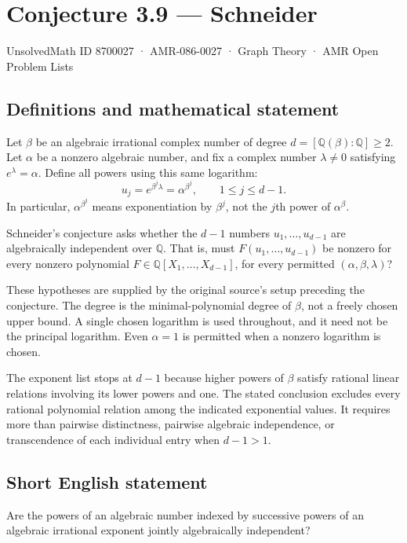 \documentclass[11pt,a4paper]{article}
\begin{document}
\section*{Conjecture 3.9 — Schneider}\label{8700027}
{\small UnsolvedMath ID 8700027 · AMR-086-0027 · Graph Theory · AMR Open Problem Lists}
\subsection{Definitions and mathematical statement}
Let $\beta$ be an algebraic irrational complex number of degree $d=[\mathbb Q(\beta):\mathbb Q]\ge2$. Let $\alpha$ be a nonzero algebraic number, and fix a complex number $\lambda\ne0$ satisfying $e^\lambda=\alpha$. Define all powers using this same logarithm:
\[
u_j=e^{\beta^j\lambda}=\alpha^{\beta^j},\qquad 1\le j\le d-1.
\]
In particular, $\alpha^{\beta^j}$ means exponentiation by $\beta^j$, not the $j$th power of $\alpha^\beta$.

Schneider's conjecture asks whether the $d-1$ numbers $u_1,\ldots,u_{d-1}$ are algebraically independent over $\mathbb Q$. That is, must $F(u_1,\ldots,u_{d-1})$ be nonzero for every nonzero polynomial $F\in\mathbb Q[X_1,\ldots,X_{d-1}]$, for every permitted $(\alpha,\beta,\lambda)$?

These hypotheses are supplied by the original source's setup preceding the conjecture. The degree is the minimal-polynomial degree of $\beta$, not a freely chosen upper bound. A single chosen logarithm is used throughout, and it need not be the principal logarithm. Even $\alpha=1$ is permitted when a nonzero logarithm is chosen.

The exponent list stops at $d-1$ because higher powers of $\beta$ satisfy rational linear relations involving its lower powers and one. The stated conclusion excludes every rational polynomial relation among the indicated exponential values. It requires more than pairwise distinctness, pairwise algebraic independence, or transcendence of each individual entry when $d-1>1$.
\subsection{Short English statement}
Are the powers of an algebraic number indexed by successive powers of an algebraic irrational exponent jointly algebraically independent?
\end{document}
